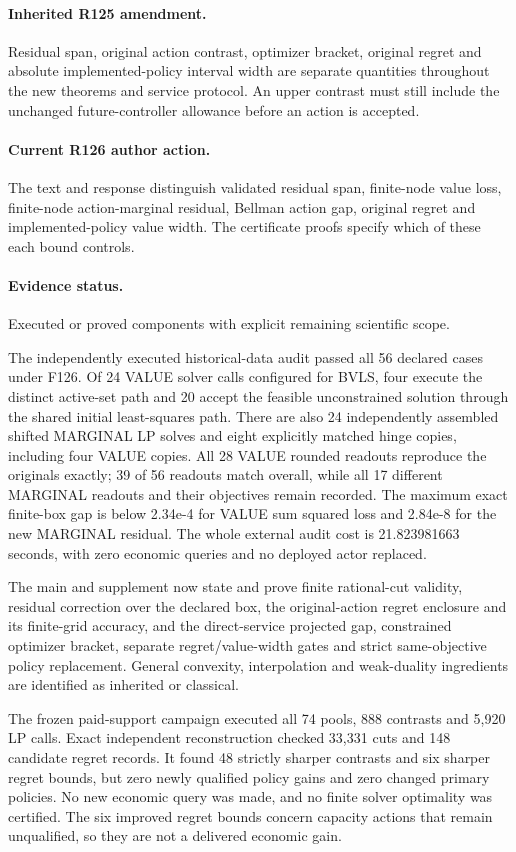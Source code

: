 \paragraph{Inherited R125 amendment.} Residual span, original action contrast, optimizer bracket, original regret and absolute implemented-policy interval width are separate quantities throughout the new theorems and service protocol. An upper contrast must still include the unchanged future-controller allowance before an action is accepted.

\paragraph{Current R126 author action.} The text and response distinguish validated residual span, finite-node value loss, finite-node action-marginal residual, Bellman action gap, original regret and implemented-policy value width. The certificate proofs specify which of these each bound controls.

\paragraph{Evidence status.} Executed or proved components with explicit remaining scientific scope.

The independently executed historical-data audit passed all 56 declared cases under F126. Of 24 VALUE solver calls configured for BVLS, four execute the distinct active-set path and 20 accept the feasible unconstrained solution through the shared initial least-squares path. There are also 24 independently assembled shifted MARGINAL LP solves and eight explicitly matched hinge copies, including four VALUE copies. All 28 VALUE rounded readouts reproduce the originals exactly; 39 of 56 readouts match overall, while all 17 different MARGINAL readouts and their objectives remain recorded. The maximum exact finite-box gap is below 2.34e-4 for VALUE sum squared loss and 2.84e-8 for the new MARGINAL residual. The whole external audit cost is 21.823981663 seconds, with zero economic queries and no deployed actor replaced.\par
The main and supplement now state and prove finite rational-cut validity, residual correction over the declared box, the original-action regret enclosure and its finite-grid accuracy, and the direct-service projected gap, constrained optimizer bracket, separate regret/value-width gates and strict same-objective policy replacement. General convexity, interpolation and weak-duality ingredients are identified as inherited or classical.\par
The frozen paid-support campaign executed all 74 pools, 888 contrasts and 5,920 LP calls. Exact independent reconstruction checked 33,331 cuts and 148 candidate regret records. It found 48 strictly sharper contrasts and six sharper regret bounds, but zero newly qualified policy gains and zero changed primary policies. No new economic query was made, and no finite solver optimality was certified. The six improved regret bounds concern capacity actions that remain unqualified, so they are not a delivered economic gain.\par

